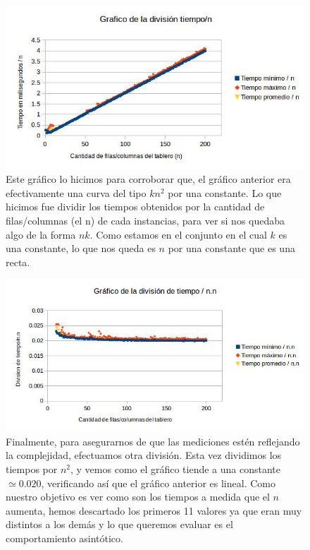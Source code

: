 \documentclass[a4paper]{article}
\begin{document}
\pagebreak
\begin{figure}[h!]
\centering
\includegraphics[width=\textwidth]{conjAlinea.jpg}\caption{Este gráfico lo hicimos para corroborar que, el gráfico anterior era efectivamente una curva del tipo $kn^2$ por una constante. Lo que hicimos fue dividir los tiempos obtenidos por la cantidad de filas/columnas (el n) de cada instancias, para ver si nos quedaba algo de la forma $nk$. Como estamos en el conjunto en el cual $k$ es una constante, lo que nos queda es $n$ por una constante que es una recta.}
\end{figure}
\begin{figure}[h!]
\centering
\includegraphics[width=\textwidth]{conjAconst.jpg}\caption{Finalmente, para asegurarnos de que las mediciones estén reflejando la complejidad, efectuamos otra división. Esta vez dividimos los tiempos por $n^2$, y vemos como el gráfico tiende a una constante $\simeq 0.020$, verificando así que el gráfico anterior es lineal. Como nuestro objetivo es ver como son los tiempos a medida que el $n$ aumenta, hemos descartado los primeros 11 valores ya que eran muy distintos a los demás y lo que queremos evaluar es el comportamiento asintótico.}
\end{figure}
\end{document}
